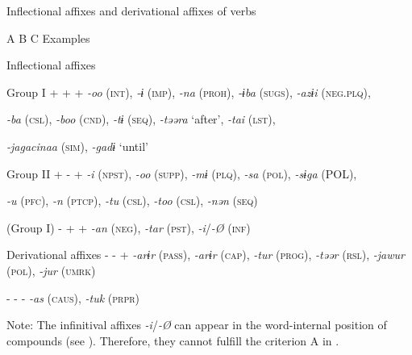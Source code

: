 \begin{table}
\caption{\label{tab:key:55}Inflectional affixes and derivational affixes of verbs}

  A  B  C  Examples

Inflectional affixes

  Group I  +  +  +  \textit{-oo} (\textsc{int}), \textit{-ɨ} (\textsc{imp}), \textit{-na} (\textsc{proh}), \textit{-ɨba} (\textsc{sugs}), \textit{-azɨi} (\textsc{neg}.\textsc{plq}),

\textit{-ba} (\textsc{csl}), \textit{-boo} (\textsc{cnd}), \textit{-tɨ} (\textsc{seq}), \textit{-təəra} ‘after’, \textit{-tai} (\textsc{lst}),

\textit{-jagacinaa} (\textsc{sim}), \textit{-gadɨ} ‘until’

  Group II  +  -  +  \textit{-i} (\textsc{npst}), \textit{-oo} (\textsc{supp}), \textit{-mɨ} (\textsc{plq}), \textit{-sa} (\textsc{pol}), \textit{-sɨga} (POL),

\textit{-u} (\textsc{pfc}), \textit{-n} (\textsc{ptcp}), \textit{-tu} (\textsc{csl}), \textit{-too} (\textsc{csl}), \textit{-nən} (\textsc{seq})

  (Group I)  -  +  +  \textit{-an} (\textsc{neg}), \textit{-tar} (\textsc{pst}), \textit{-i}/\textit{-Ø} (\textsc{inf})

Derivational affixes  -  -  +  \textit{-arɨr} (\textsc{pass}), \textit{-arɨr} (\textsc{cap}), \textit{-tur} (\textsc{prog}), \textit{-təər} (\textsc{rsl}), \textit{-jawur} (\textsc{pol}), \textit{-jur} (\textsc{umrk})

  -  -  -  \textit{-as} (\textsc{caus}), \textit{-tuk} (\textsc{prpr})

Note: The infinitival affixes \textit{-i}/\textit{-Ø} can appear in the word-internal position of compounds (see ). Therefore, they cannot fulfill the criterion A in .
\end{table}

